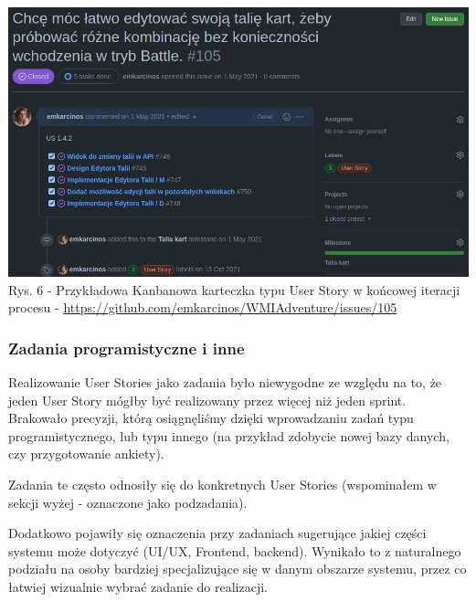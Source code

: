 \documentclass{article}
\begin{document}
\begin{center}
    \includegraphics[scale=0.5]{card_user_story_example.png}
    \newline
    Rys. 6 - Przykładowa Kanbanowa karteczka typu User Story w końcowej iteracji procesu - \url{https://github.com/emkarcinos/WMIAdventure/issues/105}
\end{center}

\subsubsection*{Zadania programistyczne i inne}
Realizowanie User Stories jako zadania było niewygodne ze względu na to, że jeden User Story mógłby być realizowany przez więcej niż jeden sprint. Brakowało precyzji, którą osiągnęliśmy dzięki wprowadzaniu zadań typu programistycznego, lub typu innego (na przykład zdobycie nowej bazy danych, czy przygotowanie ankiety).

Zadania te często odnosiły się do konkretnych User Stories (wspominałem w sekcji wyżej - oznaczone jako podzadania).

Dodatkowo pojawiły się oznaczenia przy zadaniach sugerujące jakiej części systemu może dotyczyć (UI/UX, Frontend, backend). Wynikało to z naturalnego podziału na osoby bardziej specjalizujące się w danym obszarze systemu, przez co łatwiej wizualnie wybrać zadanie do realizacji.
\end{document}
